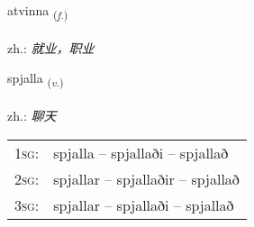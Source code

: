 \documentclass[frontgrid, backgrid]{flacards}\usepackage[]{graphicx}\usepackage[]{xcolor}
\begin{document}
{atvinna \small{\textsubscript{(\textit{f.})}} \\[1ex] %
\textphonetic{[aːtvɪna]} \\
zh.: \emph{就业，职业} \\  [2ex]
\renewcommand*{\arraystretch}{0.8}
}

\renewcommand{\flhead}{\vskip5pt \fboxsep=0pt {\small\bfseries\footnotesize Sagnorð | 动词}}
\renewcommand{\fcfoot}{\vskip5pt \fboxsep=0pt \hspace{2pt}{\small\bfseries\footnotesize 3K}}

\renewcommand{\blhead}{\vskip5pt {\small\bfseries\footnotesize Sagnorð | 动词 }}
\renewcommand{\bcfoot}{\vskip5pt \hspace{2pt}{\small\bfseries\footnotesize 3K}}


{spjalla \small{\textsubscript{(\textit{v.})}} \\[1ex] %
\textphonetic{[spjatla]} \\
zh.: \emph{聊天} \\  [2ex]
\renewcommand*{\arraystretch}{0.8}
\begin{tabular}{p{1cm}l}
\textsc{1sg}: & spjalla -- spjallaði -- spjallað \\ 
\textsc{2sg}: & spjallar -- spjallaðir -- spjallað \\ 
\textsc{3sg}: & spjallar -- spjallaði -- spjallað \\ 
\end{tabular}
}

\renewcommand{\flhead}{\vskip5pt \fboxsep=0pt {\small\bfseries\footnotesize Nafnorð | 名词}}
\renewcommand{\fcfoot}{\vskip5pt \fboxsep=0pt \hspace{2pt}{\small\bfseries\footnotesize 3K}}
\end{document}
